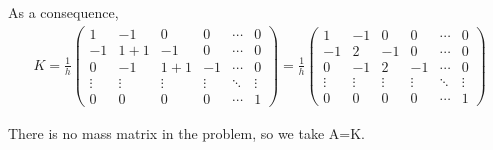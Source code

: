 \documentclass{article}
\begin{document}
\noindent As a consequence,
\begin{gather*}
    K=\frac{1}{h}\begin{pmatrix}
        1 & -1 & 0 & 0 & \cdots & 0\\
        -1 & 1+1 & -1 & 0 & \cdots & 0\\ 
        0 & -1 & 1+1 & -1 & \cdots & 0\\
        \vdots & \vdots & \vdots & \vdots & \ddots & \vdots\\
        0 & 0 & 0 & 0 & \cdots & 1
    \end{pmatrix}=
    \frac{1}{h}\begin{pmatrix}
        1 & -1 & 0 & 0 & \cdots & 0\\
        -1 & 2 & -1 & 0 & \cdots & 0\\ 
        0 & -1 & 2 & -1 & \cdots & 0\\
        \vdots & \vdots & \vdots & \vdots & \ddots & \vdots\\
        0 & 0 & 0 & 0 & \cdots & 1
    \end{pmatrix}
\end{gather*}

\noindent There is no mass matrix in the problem, so we take A=K. 
\end{document}
